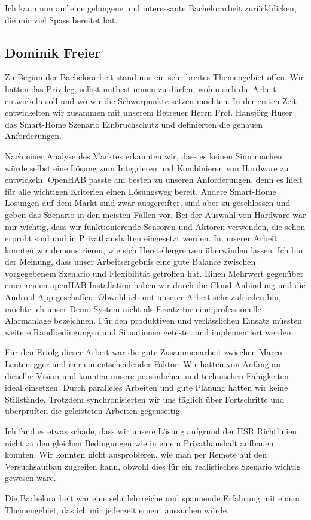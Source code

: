 Ich kann nun auf eine gelungene und interessante Bachelorarbeit zurückblicken, die mir viel Spass bereitet hat.

\pagebreak

\subsection*{Dominik Freier}
Zu Beginn der Bachelorarbeit stand uns ein sehr breites Themengebiet offen. Wir hatten das Privileg, selbst mitbestimmen zu dürfen, wohin sich die Arbeit entwickeln soll und wo wir die Schwerpunkte setzen möchten. In der ersten Zeit entwickelten wir zusammen mit unserem Betreuer Herrn Prof. Hansjörg Huser das Smart-Home Szenario Einbruchschutz und definierten die genauen Anforderungen. 

Nach einer Analyse des Marktes erkannten wir, dass es keinen Sinn machen würde selbst eine Lösung zum Integrieren und Kombinieren von Hardware zu entwickeln. OpenHAB passte am besten zu unseren Anforderungen, denn es hielt für alle wichtigen Kriterien einen Lösungsweg bereit. Andere Smart-Home Lösungen auf dem Markt sind zwar ausgereifter, sind aber zu geschlossen und geben das Szenario in den meisten Fällen vor. Bei der Auswahl von Hardware war mir wichtig, dass wir funktionierende Sensoren und Aktoren verwenden, die schon erprobt sind und in Privathaushalten eingesetzt werden. In unserer Arbeit konnten wir demonstrieren, wie sich Herstellergrenzen überwinden lassen. Ich bin der Meinung, dass unser Arbeitsergebnis eine gute Balance zwischen vorgegebenem Szenario und Flexibilität getroffen hat. Einen Mehrwert gegenüber einer reinen openHAB Installation haben wir durch die Cloud-Anbindung und die Android App geschaffen. Obwohl ich mit unserer Arbeit sehr zufrieden bin, möchte ich unser Demo-System nicht als Ersatz für eine professionelle Alarmanlage bezeichnen. Für den produktiven und verlässlichen Einsatz müssten weitere Randbedingungen und Situationen getestet und implementiert werden.

Für den Erfolg dieser Arbeit war die gute Zusammenarbeit zwischen Marco Leutenegger und mir ein entscheidender Faktor. Wir hatten von Anfang an dieselbe Vision und konnten unsere persönlichen und technischen Fähigkeiten ideal einsetzen. Durch paralleles Arbeiten und gute Planung hatten wir keine Stillstände. Trotzdem synchronisierten wir uns täglich über Fortschritte und überprüften die geleisteten Arbeiten gegenseitig. 

Ich fand es etwas schade, dass wir unsere Lösung aufgrund der HSR Richtlinien nicht zu den gleichen Bedingungen wie in einem Privathaushalt aufbauen konnten. Wir konnten nicht ausprobieren, wie man per Remote auf den Versuchsaufbau zugreifen kann, obwohl dies für ein realistisches Szenario wichtig gewesen wäre.

Die Bachelorarbeit war eine sehr lehrreiche und spannende Erfahrung mit einem Themengebiet, das ich mir jederzeit erneut aussuchen würde.

